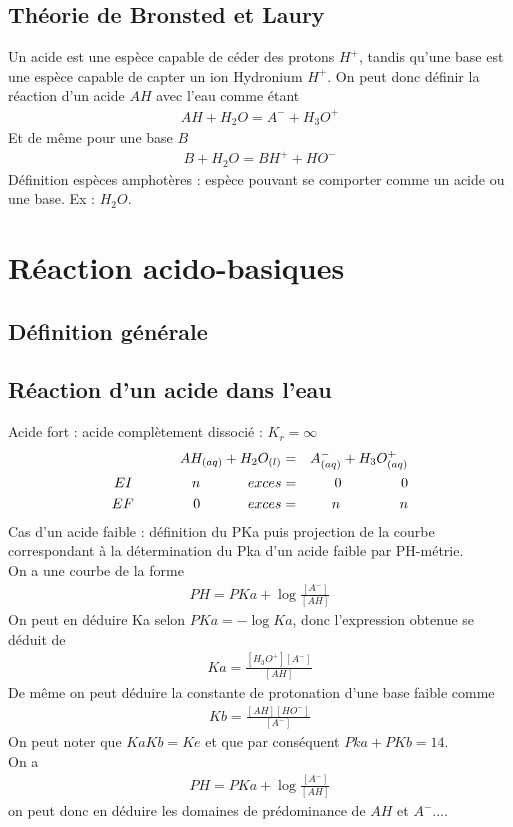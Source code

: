 \documentclass[12pt,prb,aps,epsf]{report}
\begin{document}
\subsection{Théorie de Bronsted et Laury}
Un acide est une espèce capable de céder des protons $H^+$, tandis qu'une base est une espèce capable de capter un ion Hydronium $H^+$. On peut donc définir la réaction d'un acide $AH$ avec l'eau comme étant 
\begin{eqnarray}
AH + H_2O = A^- + H_3O^+
\end{eqnarray}
Et de même pour une base $B$
\begin{eqnarray}
B + H_2O = BH^+ + HO^-
\end{eqnarray}
Définition espèces amphotères : espèce pouvant se comporter comme un acide ou une base. Ex : $H_2O$.

\section{Réaction acido-basiques}
\subsection{Définition générale}
\subsection{Réaction d'un acide dans l'eau}
Acide fort : acide complètement dissocié : $K_r = \infty$
\begin{eqnarray}
AH_{(aq)} + H_2O_{(l)} &=& A^-_{(aq)} + H_3O^+_{(aq)}\\
EI\hspace{1.5cm} n\hspace{1.2cm} exces &=& 0 \hspace{1.5cm} 0\\
EF\hspace{1.5cm} 0 \hspace{1.2cm} exces &=& n \hspace{1.5cm} n
\end{eqnarray}
Cas d'un acide faible : définition du PKa puis projection de la courbe correspondant à la détermination du Pka d'un acide faible par PH-métrie.\\
On a une courbe de la forme 
\begin{eqnarray}
PH = PKa + \log\frac{[A^-]}{[AH]}
\end{eqnarray}
On peut en déduire Ka selon $PKa = -\log Ka$, donc l'expression obtenue se déduit de 
\begin{eqnarray}
Ka = \frac{[H_3O^+][A^-]}{[AH]}
\end{eqnarray}
De même on peut déduire la constante de protonation d'une base faible comme 
\begin{eqnarray}
Kb = \frac{[AH][HO^-]}{[A^-]}
\end{eqnarray}
On peut noter que $KaKb = Ke$ et que par conséquent $Pka + PKb = 14$.\\
On a
\begin{eqnarray}
PH = PKa + \log\frac{[A^-]}{[AH]}
\end{eqnarray}
on peut donc en déduire les domaines de prédominance de $AH$ et $A^-$....
\end{document}
